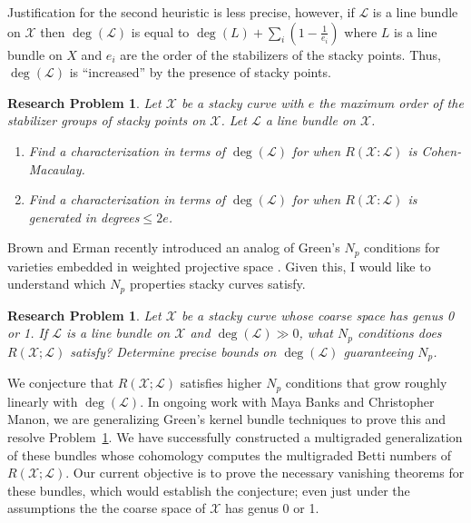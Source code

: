 \documentclass[11pt,reqno]{amsart}
\newtheorem{problem}[lemma]{Research Problem}
\theoremstyle{remark}
\newcommand{\cL}{\mathcal{L}}
\newcommand{\cX}{\mathcal{X}}
\begin{document}
Justification for the second heuristic is less precise, however, if $\cL$ is a line bundle on $\cX$ then $\deg(\cL)$ is equal to $\deg(L)+ \sum_{i}(1-\tfrac{1}{e_i})$ where $L$ is a line bundle on $X$ and $e_i$ are the order of the stabilizers of the stacky points. Thus, $\deg(\cL)$  is ``increased'' by the presence of stacky points. 

\begin{problem}
	Let $\cX$ be a stacky curve with $e$ the maximum order of the stabilizer groups of stacky points on $\cX$. Let $\cL$ a line bundle on $\cX$. 
	\begin{enumerate}
	\item Find a characterization in terms of $\deg(\cL)$ for when $R(\cX:\cL)$ is Cohen-Macaulay.
	\item Find a characterization in terms of $\deg(\cL)$ for when $R(\cX:\cL)$ is generated in degrees$\leq 2e$. 
	\end{enumerate}
\end{problem}

Brown and Erman recently introduced an analog of Green's $N_{p}$ conditions for varieties embedded in weighted projective space \cite[Definition 1.2]{brownErman25}. Given this, I would like to understand which $N_p$ properties stacky curves satisfy.
\begin{problem}\label{prob:gen01-np}
	Let $\cX$ be a stacky curve whose coarse space has genus 0 or 1. If $\cL$ is a line bundle on $\cX$ and $\deg(\cL)\gg0$, what $N_{p}$ conditions does $R(\cX; \cL)$ satisfy? Determine precise bounds on $\deg(\cL)$ guaranteeing $N_p$.
\end{problem}

We conjecture that $R(\cX; \cL)$ satisfies higher $N_{p}$ conditions that grow roughly linearly with $\deg(\cL)$. In ongoing work with Maya Banks and Christopher Manon, we are generalizing Green's kernel bundle techniques \cite{green84-I} to prove this and resolve Problem~\ref{prob:gen01-np}. We have successfully constructed a multigraded generalization of these bundles whose cohomology computes the multigraded Betti numbers of $R(\cX; \cL)$. Our current objective is to prove the necessary vanishing theorems for these bundles, which would establish the conjecture; even just under the assumptions the the coarse space of $\cX$ has genus 0 or 1. 



\end{document}
